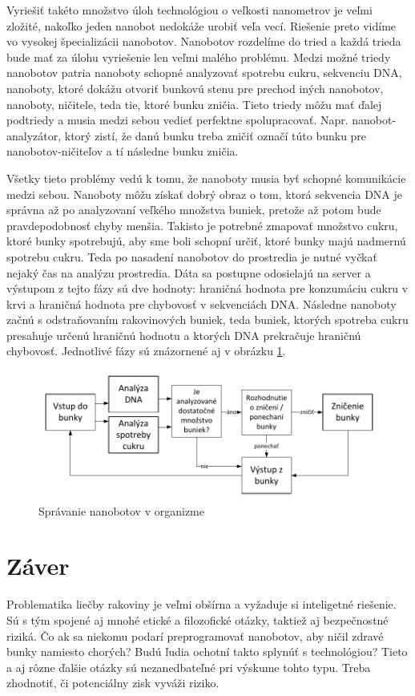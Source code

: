 \documentclass[10pt,twoside,slovak,a4paper]{article}
\begin{document}
Vyriešiť takéto množstvo úloh technológiou o veľkosti nanometrov je veľmi zložité, nakoľko jeden nanobot nedokáže urobiť veľa vecí. Riešenie preto vidíme vo vysokej špecializácii nanobotov. Nanobotov rozdelíme do tried a každá trieda bude mať za úlohu vyriešenie len veľmi malého problému. Medzi možné triedy nanobotov patria nanoboty schopné analyzovať spotrebu cukru, sekvenciu DNA, nanoboty, ktoré dokážu otvoriť bunkovú stenu pre prechod iných nanobotov, nanoboty, ničitele, teda tie, ktoré bunku zničia. Tieto triedy môžu mať ďalej podtriedy a musia medzi sebou vedieť perfektne spolupracovať. Napr. nanobot-analyzátor, ktorý zistí, že danú bunku treba zničiť označí túto bunku pre nanobotov-ničiteľov a tí následne bunku zničia.

Všetky tieto problémy vedú k tomu, že nanoboty musia byť schopné komunikácie medzi sebou. Nanoboty môžu získať dobrý obraz o tom, ktorá sekvencia DNA je správna až po analyzovaní veľkého množstva buniek, pretože až potom bude pravdepodobnosť chyby menšia. Takisto je potrebné zmapovať množstvo cukru, ktoré bunky spotrebujú, aby sme boli schopní určiť, ktoré bunky majú nadmernú spotrebu cukru. Teda po nasadení nanobotov do prostredia je nutné vyčkať nejaký čas na analýzu prostredia. Dáta sa postupne odosielajú na server a výstupom z tejto fázy sú dve hodnoty: hraničná hodnota pre konzumáciu cukru v krvi a hraničná hodnota pre chybovosť v sekvenciách DNA. Následne nanoboty začnú s odstraňovaním rakovinových buniek, teda buniek, ktorých spotreba cukru presahuje určenú hraničnú hodnotu a ktorých DNA prekračuje hraničnú chybovosť. Jednotlivé fázy sú znázornené aj v obrázku \ref{f:spravanie}.

\begin{figure}[tbh]
\label{f:spravanie}
\centering
\includegraphics[scale=0.9]{spravanie.pdf}
\caption{Správanie nanobotov v organizme}
\end{figure}
\section{Záver}

Problematika liečby rakoviny je veľmi obšírna a vyžaduje si inteligetné riešenie. Sú s tým spojené aj mnohé etické a filozofické otázky, taktiež aj bezpečnostné riziká. Čo ak sa niekomu podarí preprogramovať nanobotov, aby ničil zdravé bunky namiesto chorých? Budú ľudia ochotní takto splynúť s technológiou? Tieto a aj rôzne ďalšie otázky sú nezanedbateľné pri výskume tohto typu. Treba zhodnotiť, či potenciálny zisk vyváži riziko.

\listoffigures


\end{document}
